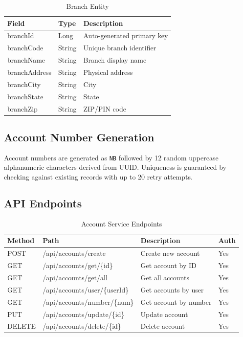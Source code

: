 \documentclass[12pt,a4paper]{report}
\begin{document}
\begin{table}[H]
\centering
\caption{Branch Entity}
\begin{tabularx}{\textwidth}{llX}
\toprule
\textbf{Field} & \textbf{Type} & \textbf{Description} \\
\midrule
branchId & Long & Auto-generated primary key \\
branchCode & String & Unique branch identifier \\
branchName & String & Branch display name \\
branchAddress & String & Physical address \\
branchCity & String & City \\
branchState & String & State \\
branchZip & String & ZIP/PIN code \\
\bottomrule
\end{tabularx}
\end{table}

\subsection{Account Number Generation}
Account numbers are generated as \texttt{NB} followed by 12 random uppercase alphanumeric characters derived from UUID. Uniqueness is guaranteed by checking against existing records with up to 20 retry attempts.

\subsection{API Endpoints}

\begin{table}[H]
\centering
\caption{Account Service Endpoints}
\begin{tabularx}{\textwidth}{llXl}
\toprule
\textbf{Method} & \textbf{Path} & \textbf{Description} & \textbf{Auth} \\
\midrule
POST & /api/accounts/create & Create new account & Yes \\
GET & /api/accounts/get/\{id\} & Get account by ID & Yes \\
GET & /api/accounts/get/all & Get all accounts & Yes \\
GET & /api/accounts/user/\{userId\} & Get accounts by user & Yes \\
GET & /api/accounts/number/\{num\} & Get account by number & Yes \\
PUT & /api/accounts/update/\{id\} & Update account & Yes \\
DELETE & /api/accounts/delete/\{id\} & Delete account & Yes \\
\bottomrule
\end{tabularx}
\end{table}
\end{document}
